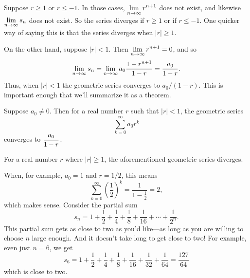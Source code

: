 Suppose $r \geq 1$ or $r \leq -1$.  In those cases, $\displaystyle\lim_{n \to
  \infty} r^{n+1}$ does not exist, and likewise $\displaystyle\lim_{n \to
  \infty} s_n$ does not exist.  So the series diverges if $r \geq 1$
or if $r \leq -1$.  One quicker way of saying this is that the series
diverges when $|r| \geq 1$.

On the other hand, suppose $|r| < 1$.  Then $\displaystyle\lim_{n\to\infty} r^{n+1}=0$, and so
$$
  \lim_{n\to\infty}s_n=\lim_{n\to\infty}a_0{1-r^{n+1}\over 1-r}=
  \frac{a_0}{1-r}.
$$ 
Thus, when $|r|<1$ the geometric series converges to $a_0/(1-r)$.   This is important enough that we'll summarize it as a theorem.

\begin{theorem}\label{thm:geometric-series}
  Suppose $a_0 \neq 0$.  Then for a real number $r$ such that $|r| < 1$, the geometric series
  $$
  \sum_{k=0}^\infty a_0 r^k
  $$
  converges to $\displaystyle\frac{a_0}{1-r}$.

  For a real number $r$ where $|r| \geq 1$, the aforementioned
  geometric series diverges.
\end{theorem}

\begin{example}
\label{example:sum-of-half-powers}
  When, for example, $a_0=1$ and $r=1/2$, this means
$$
\sum_{k=0}^\infty \left( \frac{1}{2} \right)^k = \frac{1}{1 - \frac{1}{2}} = 2,
$$
which makes sense.  Consider the partial sum
$$
s_n = 1 + \frac{1}{2} 
 + \frac{1}{4} 
 + \frac{1}{8} 
 + \frac{1}{16}  + \cdots + \frac{1}{2^n}.
$$
This partial sum gets as close to two as you'd like---as long as you are willing to choose $n$ large enough.  And it doesn't take long to get close to two!  For example, even just $n=6$, we get
$$
s_6 = 
1
+ \frac{1}{2} 
+ \frac{1}{4} 
+ \frac{1}{8} 
+ \frac{1}{16} 
+ \frac{1}{32} 
+ \frac{1}{64} = \frac{127}{64}
$$
which is close to two.
\end{example}


